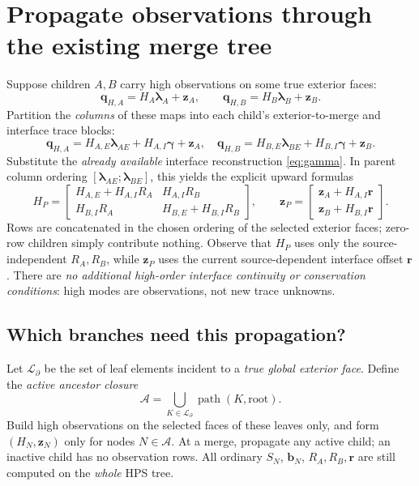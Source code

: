 \documentclass[11pt,letterpaper]{article}
\newcommand{\lam}{\boldsymbol\lambda}
\newcommand{\gam}{\boldsymbol\gamma}
\newcommand{\bb}{\mathbf b}
\newcommand{\zz}{\mathbf z}
\begin{document}
\section{Propagate observations through the existing merge tree}
Suppose children \(A,B\) carry high observations on some true exterior faces:
\begin{equation}
 \mathbf q_{H,A}=H_A\lam_A+\zz_A,\qquad
 \mathbf q_{H,B}=H_B\lam_B+\zz_B.
\end{equation}
Partition the \emph{columns} of these maps into each child's exterior-to-merge and interface trace blocks:
\begin{equation}\label{eq:highchild}
 \mathbf q_{H,A}=H_{A,E}\lam_{AE}+H_{A,I}\gam+\zz_A,\quad
 \mathbf q_{H,B}=H_{B,E}\lam_{BE}+H_{B,I}\gam+\zz_B.
\end{equation}
Substitute the \emph{already available} interface reconstruction \eqref{eq:gamma}. In parent column ordering \([\lam_{AE};\lam_{BE}]\), this yields the explicit upward formulas
\begin{equation}\label{eq:propH}
 \boxed{\quad
 H_P=
 \begin{bmatrix}
 H_{A,E}+H_{A,I}R_A & H_{A,I}R_B\\[3pt]
 H_{B,I}R_A & H_{B,E}+H_{B,I}R_B
 \end{bmatrix},\qquad
 \zz_P=
 \begin{bmatrix}
 \zz_A+H_{A,I}\mathbf r\\[3pt]
 \zz_B+H_{B,I}\mathbf r
 \end{bmatrix}.\quad}
\end{equation}
Rows are concatenated in the chosen ordering of the selected exterior faces; zero-row children simply contribute nothing. Observe that \(H_P\) uses only the source-independent \(R_A,R_B\), while \(\zz_P\) uses the current source-dependent interface offset \(\mathbf r\). There are \emph{no additional high-order interface continuity or conservation conditions}: high modes are observations, not new trace unknowns.

\subsection*{Which branches need this propagation?}
Let \(\mathcal L_{\partial}\) be the set of leaf elements incident to a \emph{true global exterior face}. Define the \emph{active ancestor closure}
\begin{equation}\label{eq:closure}
 \mathcal A=\bigcup_{K\in\mathcal L_{\partial}}
 \operatorname{path}(K,\mathrm{root}).
\end{equation}
Build high observations on the selected faces of these leaves only, and form \((H_N,\zz_N)\) only for nodes \(N\in\mathcal A\). At a merge, propagate any active child; an inactive child has no observation rows. All ordinary \(S_N\), \(\bb_N\), \(R_A,R_B,\mathbf r\) are still computed on the \emph{whole} HPS tree.
\end{document}
